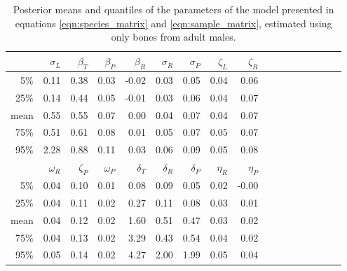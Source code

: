 \documentclass[12pt]{article}
\begin{document}
\begin{table}[ht]
    \footnotesize
\centering
\begin{tabular}{rrrrrrrrrrrrrrrrr}
  \hline
        &  $\sigma_L$  &  $\beta_T$  &  $\beta_P$  &  $\beta_R$  &  $\sigma_R$  &  $\sigma_P$  &  $\zeta_L$  &  $\zeta_R$   \\
\hline
5\%     &  0.11        &  0.38       &  0.03       &  -0.02      &  0.03        &  0.05        &  0.04       &  0.06        \\
25\%    &  0.14        &  0.44       &  0.05       &  -0.01      &  0.03        &  0.06        &  0.04       &  0.07        \\
mean    &  0.55        &  0.55       &  0.07       &  0.00       &  0.04        &  0.07        &  0.04       &  0.07        \\
75\%    &  0.51        &  0.61       &  0.08       &  0.01       &  0.05        &  0.07        &  0.05       &  0.07        \\
95\%    &  2.28        &  0.88       &  0.11       &  0.03       &  0.06        &  0.09        &  0.05       &  0.08        \\
   \hline
  \hline
        &    $\omega_R$  &  $\zeta_P$  &  $\omega_P$  &  $\delta_T$  &  $\delta_R$  &  $\delta_P$  &  $\eta_R$  &  $\eta_P$  \\
\hline
5\%     &    0.04        &  0.10       &  0.01        &  0.08        &  0.09        &  0.05        &  0.02      &  -0.00     \\
25\%    &    0.04        &  0.11       &  0.02        &  0.27        &  0.11        &  0.08        &  0.03      &  0.01      \\
mean    &    0.04        &  0.12       &  0.02        &  1.60        &  0.51        &  0.47        &  0.03      &  0.02      \\
75\%    &    0.04        &  0.13       &  0.02        &  3.29        &  0.43        &  0.54        &  0.04      &  0.02      \\
95\%    &    0.05        &  0.14       &  0.02        &  4.27        &  2.00        &  1.99        &  0.05      &  0.04      \\
   \hline
\end{tabular}
\caption{ \label{tab:posterior_distrns} Posterior means and quantiles of the parameters of the model presented in equations \eqref{eqn:species_matrix} and \eqref{eqn:sample_matrix}, estimated using only bones from adult males.  }
\end{table}
\end{document}
